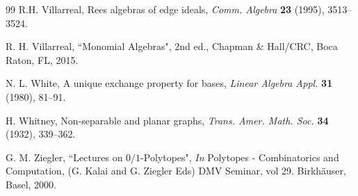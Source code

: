 \documentclass[12pt]{amsart}
\theoremstyle{definition}
\numberwithin{thm}{section}
\numberwithin{equation}{section}
\begin{document}
\begin{thebibliography}{99}
 R.H. Villarreal, Rees algebras of edge ideals, 
 {\it Comm. Algebra} {\bf 23} (1995), 3513--3524.

R. H. Villarreal, ``Monomial Algebras", 2nd ed., Chapman \& Hall/CRC, Boca Raton, FL, 2015.

N. L. White, A unique exchange property for bases, 
\textit{Linear Algebra Appl.} {\bf 31} (1980),
81--91.

H. Whitney,
Non-separable and planar graphs,
{\it Trans. Amer. Math. Soc.} {\bf 34} (1932), 339--362.


G. M. Ziegler, ``Lectures on $0/1$-Polytopes",
{\it In} Polytopes - Combinatorics and Computation,
(G. Kalai and G. Ziegler Eds)
DMV Seminar, vol 29. Birkh\"{a}user, Basel, 2000.
\end{thebibliography}
\end{document}
